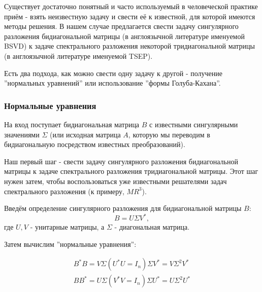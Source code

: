 Существует достаточно понятный и часто используемый в человеческой практике приём - взять неизвестную задачу и свести её к известной, для которой имеются методы решения. В нашем случае предлагается свести задачу сингулярного разложения бидиагональной матрицы (в англоязычной литературе именуемой BSVD) к задаче спектрального разложения некоторой тридиагональной матрицы (в англоязычной литературе именуемой TSEP).

Есть два подхода, как можно свести одну задачу к другой - получение ''нормальных уравнений'' или использование ''формы Голуба-Кахана''.


\subsubsection{Нормальные уравнения}
На вход поступает бидиагональная матрица $B$ с известными сингулярными значениями $\Sigma$ (или исходная матрица $A$, которую мы переводим в бидиагональную посредством известных преобразований).

Наш первый шаг - свести задачу сингулярного разложения бидиагональной матрицы к задаче спектрального разложения тридиагональной матрицы. Этот шаг нужен затем, чтобы воспользоваться уже известными решателями задач спектрального разложения (к примеру, $MR^3$).
\begin{note}
    Введём определение сингулярного разложения для бидиагональной матрицы $B$:
\begin{equation}
        B=U \Sigma V^*,
\end{equation}
где $U,V$ - унитарные матрицы, а $\Sigma$ - диагональная матрица.
\end{note}


Затем вычислим ''нормальные уравнения'':

\begin{equation}
    \begin{split}
        B^*B=V \Sigma (U^*U=I_n) \Sigma V^*=V \Sigma^2 V^*\\
        BB^*=U\Sigma (V^* V=I_n) \Sigma U^*=U \Sigma^2 U^*
    \end{split}
\end{equation}

